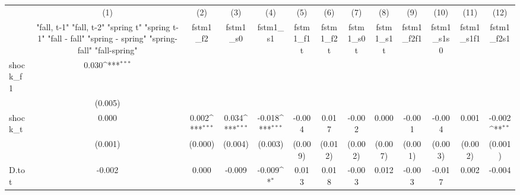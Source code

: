 {
\def\sym#1{\ifmmode^{#1}\else\(^{#1}\)\fi}
\begin{tabular}{l*{12}{c}}
\toprule
            &\multicolumn{1}{c}{(1)}&\multicolumn{1}{c}{(2)}&\multicolumn{1}{c}{(3)}&\multicolumn{1}{c}{(4)}&\multicolumn{1}{c}{(5)}&\multicolumn{1}{c}{(6)}&\multicolumn{1}{c}{(7)}&\multicolumn{1}{c}{(8)}&\multicolumn{1}{c}{(9)}&\multicolumn{1}{c}{(10)}&\multicolumn{1}{c}{(11)}&\multicolumn{1}{c}{(12)}\\
            &\multicolumn{1}{c}{  "fall, t-1" "fall, t-2" "spring t" "spring t-1"  "fall - fall" "spring - spring" "spring-fall" "fall-spring" }&\multicolumn{1}{c}{fstm1\_f2}&\multicolumn{1}{c}{fstm1\_s0}&\multicolumn{1}{c}{fstm1\_s1}&\multicolumn{1}{c}{fstm1\_f1t}&\multicolumn{1}{c}{fstm1\_f2t}&\multicolumn{1}{c}{fstm1\_s0t}&\multicolumn{1}{c}{fstm1\_s1t}&\multicolumn{1}{c}{fstm1\_f2f1}&\multicolumn{1}{c}{fstm1\_s1s0}&\multicolumn{1}{c}{fstm1\_s1f1}&\multicolumn{1}{c}{fstm1\_f2s1}\\
\midrule
shock\_f1    &       0.030\sym{***}&                     &                     &                     &                     &                     &                     &                     &                     &                     &                     &                     \\
            &     (0.005)         &                     &                     &                     &                     &                     &                     &                     &                     &                     &                     &                     \\
\addlinespace
shock\_t     &       0.000         &       0.002\sym{***}&       0.034\sym{***}&      -0.018\sym{***}&      -0.004         &       0.017         &      -0.002         &       0.000         &      -0.001         &      -0.004         &       0.001         &      -0.002\sym{**} \\
            &     (0.001)         &     (0.000)         &     (0.004)         &     (0.003)         &     (0.009)         &     (0.012)         &     (0.002)         &     (0.007)         &     (0.001)         &     (0.003)         &     (0.002)         &     (0.001)         \\
\addlinespace
D.tot       &      -0.002         &       0.000         &      -0.009         &      -0.009\sym{*}  &       0.013         &       0.018         &      -0.003         &       0.012         &      -0.003         &      -0.017         &       0.002         &      -0.004         \\

\end{tabular}}
